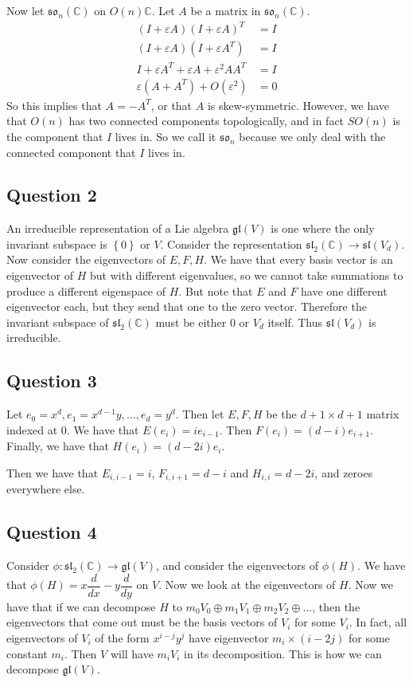 \documentclass[]{article}
\begin{document}
Now let $\mathfrak{so}_n(\mathbb{C})$ on $O(n)\mathbb{C}$. Let $A$ be a matrix in $\mathfrak{so}_n(\mathbb{C})$.
\begin{align*}
	(I + \varepsilon A)(I + \varepsilon A)^T &= I\\
	(I + \varepsilon A)(I + \varepsilon A^T) &= I\\
	I + \varepsilon A^T + \varepsilon A + \varepsilon^2 A A^T &= I\\
	\varepsilon (A + A^T) + O(\varepsilon^2) &= 0
\end{align*}
So this implies that $A = - A^T$, or that $A$ is skew-symmetric. However, we have that $O(n)$ has two connected components topologically, and in fact $SO(n)$ is the component that $I$ lives in. So we call it $\mathfrak{so}_n$ because we only deal with the connected component that $I$ lives in. 



\subsection*{Question 2}
An irreducible representation of a Lie algebra $\mathfrak{gl}(V)$ is one where the only invariant subspace is $\left\{ 0 \right\}$ or $V$. Consider the representation $\mathfrak{sl}_2(\mathbb{C}) \rightarrow \mathfrak{sl}(V_d)$. Now consider the eigenvectors of $E, F, H$. We have that every basis vector is an eigenvector of $H$ but with different eigenvalues, so we cannot take summations to produce a different eigenspace of $H$. But note that $E$ and $F$ have one different eigenvector each, but they send that one to the zero vector. Therefore the invariant subspace of $\mathfrak{sl}_2(\mathbb{C})$ must be either $0$ or $V_d$ itself. Thus $\mathfrak{sl}(V_d)$ is irreducible. 
\subsection*{Question 3}
Let $e_0 = x^d, e_1 = x^{d - 1} y , ... , e_d = y^d$. Then let $E, F, H$ be the $d + 1 \times d + 1$ matrix indexed at 0. We have that $E(e_i) = i e_{i - 1}$. Then $F(e_i) = (d - i) e_{i + 1}$. Finally, we have that $H(e_i) = (d - 2i) e_i$. 

Then we have that $E_{i, i - 1} = i$, $F_{i, i + 1} = d - i$ and $H_{i, i} = d - 2i$, and zeroes everywhere else. 

\subsection*{Question 4}
Consider $\phi: \mathfrak{sl}_2(\mathbb{C}) \rightarrow \mathfrak{gl}(V)$, and consider the eigenvectors of $\phi(H)$. We have that $\phi(H) = x \dfrac{d}{dx} - y \dfrac{d}{dy}$ on $V$. Now we look at the eigenvectors of $H$. Now we have that if we can decompose $H$ to $m_0 V_0 \oplus m_1 V_1 \oplus m_2 V_2 \oplus ... $, then the eigenvectors that come out must be the basis vectors of $V_i$ for some $V_i$. In fact, all eigenvectors of $V_i$ of the form $x^{i - j} y^{j}$ have eigenvector $m_i \times (i - 2j)$ for some constant $m_i$. Then $V$ will have $m_i V_i$ in its decomposition. This is how we can decompose $\mathfrak{gl}(V)$. 
\end{document}
